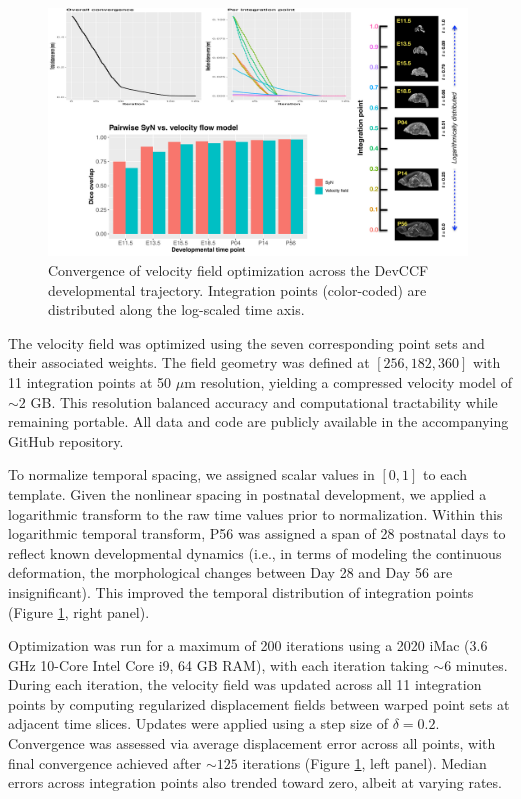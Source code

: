 \documentclass[
  12pt,
]{article}
\begin{document}
\begin{figure}[!htb]
\centering
\includegraphics[width=0.99\textwidth]{Figures/convergence.pdf}
\caption{Convergence of velocity field optimization across the DevCCF
developmental trajectory. Integration points (color-coded) are distributed along
the log-scaled time axis.}
\label{fig:convergence}
\end{figure}

The velocity field was optimized using the seven corresponding point
sets and their associated weights. The field geometry was defined at
\([256, 182, 360]\) with 11 integration points at 50 \(\mu\)m
resolution, yielding a compressed velocity model of \(\sim2\) GB. This
resolution balanced accuracy and computational tractability while
remaining portable. All data and code are publicly available in the
accompanying GitHub repository.

To normalize temporal spacing, we assigned scalar values in \([0, 1]\)
to each template. Given the nonlinear spacing in postnatal development,
we applied a logarithmic transform to the raw time values prior to
normalization. Within this logarithmic temporal transform, P56 was
assigned a span of 28 postnatal days to reflect known developmental
dynamics (i.e., in terms of modeling the continuous deformation, the
morphological changes between Day 28 and Day 56 are insignificant). This
improved the temporal distribution of integration points (Figure
\ref{fig:convergence}, right panel).

Optimization was run for a maximum of 200 iterations using a 2020 iMac
(3.6 GHz 10-Core Intel Core i9, 64 GB RAM), with each iteration taking
\(\sim6\) minutes. During each iteration, the velocity field was updated
across all 11 integration points by computing regularized displacement
fields between warped point sets at adjacent time slices. Updates were
applied using a step size of \(\delta = 0.2\). Convergence was assessed
via average displacement error across all points, with final convergence
achieved after \(\sim125\) iterations (Figure \ref{fig:convergence},
left panel). Median errors across integration points also trended toward
zero, albeit at varying rates.
\end{document}
